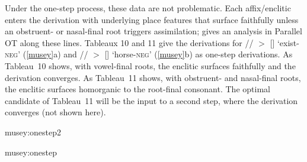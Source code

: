 \documentclass[output=paper]{LSP/langsci}
\begin{document}
Under the one-step process, these data are not problematic. Each affix/enclitic enters the derivation with underlying place features that surface faithfully unless an obstruent- or nasal-final root triggers assimilation; \citet{jun1995} gives an analysis in Parallel OT along these lines. Tableaux 10 and 11 give the derivations for // $>$ [] `exist-\textsc{neg}' (\ref{musey}a) and // $>$ [] `horse-\textsc{neg}' (\ref{musey}b) as one-step derivations. As Tableau~10 shows, with vowel-final roots, the enclitic surfaces faithfully and the derivation converges. As Tableau~11 shows, with obstruent- and nasal-final roots, the enclitic surfaces homorganic to the root-final consonant. The optimal candidate of Tableau~11 will be the input to a second step, where the derivation converges (not shown here).

\begin{table}[ht]
    		{musey:onestep2}
\end{table}

\begin{table}[H]
    		{musey:onestep}
\end{table}
\end{document}
